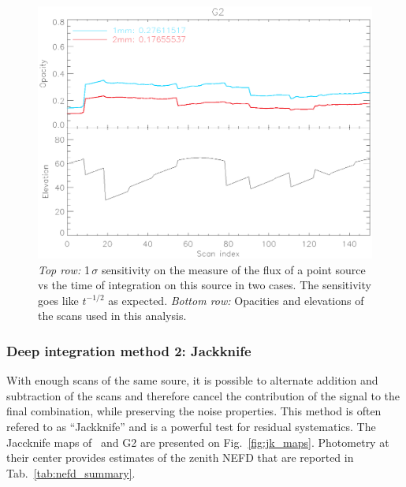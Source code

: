 \begin{figure}
\begin{center}
\includegraphics[clip, angle=0, scale =0.4]{Figures/g2_opacity_and_elev.eps}
\caption[NEFD vs time]{\emph{Top row:} 1\,$\sigma$ sensitivity on the
  measure of the flux of a point source vs the time of integration on this
  source in two cases. The sensitivity goes like $t^{-1/2}$ as
  expected. \emph{Bottom row:} Opacities and elevations of the scans used in
  this analysis.}
\label{fig:nefd_plots}
\end{center}
\end{figure}

\subsubsection{Deep integration method 2: Jackknife}

With enough scans of the same soure, it is possible to alternate addition and
subtraction of the scans and therefore cancel the contribution of the signal to
the final combination, while preserving the noise properties. This method is
often refered to as ``Jackknife'' and is a powerful test for residual
systematics. The Jaccknife maps of \hls\ and G2 are presented on
Fig.~\ref{fig:jk_maps}. Photometry at their center provides estimates of the
zenith NEFD that are reported in Tab.~\ref{tab:nefd_summary}.


